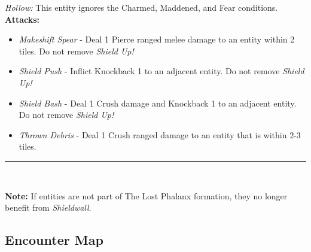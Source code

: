 \emph{Hollow:} This entity ignores the Charmed, Maddened, and Fear conditions.\\

\textbf{Attacks:}
\begin{itemize}
\item \emph{Makeshift Spear} - Deal 1 Pierce ranged melee damage to an entity within 2 tiles. Do not remove \emph{Shield Up!}
\item \emph{Shield Push} - Inflict Knockback 1 to an adjacent entity. Do not remove \emph{Shield Up!}
\item \emph{Shield Bash} - Deal 1 Crush damage and Knockback 1 to an adjacent entity. Do not remove \emph{Shield Up!}
\item \emph{Thrown Debris} - Deal 1 Crush ranged damage to an entity that is within 2-3 tiles.
\end{itemize}
\hrule
\ \\

\begin{tcolorbox}
\textbf{Note:} If entities are not part of The Lost Phalanx formation, they no longer benefit from \emph{Shieldwall}.
\end{tcolorbox}

\pagebreak

\subsection*{Encounter Map}
\begin{center}
\end{center}


